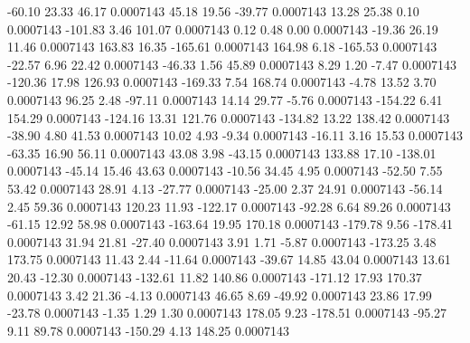       -60.10       23.33       46.17     0.0007143
       45.18       19.56      -39.77     0.0007143
       13.28       25.38        0.10     0.0007143
     -101.83        3.46      101.07     0.0007143
        0.12        0.48        0.00     0.0007143
      -19.36       26.19       11.46     0.0007143
      163.83       16.35     -165.61     0.0007143
      164.98        6.18     -165.53     0.0007143
      -22.57        6.96       22.42     0.0007143
      -46.33        1.56       45.89     0.0007143
        8.29        1.20       -7.47     0.0007143
     -120.36       17.98      126.93     0.0007143
     -169.33        7.54      168.74     0.0007143
       -4.78       13.52        3.70     0.0007143
       96.25        2.48      -97.11     0.0007143
       14.14       29.77       -5.76     0.0007143
     -154.22        6.41      154.29     0.0007143
     -124.16       13.31      121.76     0.0007143
     -134.82       13.22      138.42     0.0007143
      -38.90        4.80       41.53     0.0007143
       10.02        4.93       -9.34     0.0007143
      -16.11        3.16       15.53     0.0007143
      -63.35       16.90       56.11     0.0007143
       43.08        3.98      -43.15     0.0007143
      133.88       17.10     -138.01     0.0007143
      -45.14       15.46       43.63     0.0007143
      -10.56       34.45        4.95     0.0007143
      -52.50        7.55       53.42     0.0007143
       28.91        4.13      -27.77     0.0007143
      -25.00        2.37       24.91     0.0007143
      -56.14        2.45       59.36     0.0007143
      120.23       11.93     -122.17     0.0007143
      -92.28        6.64       89.26     0.0007143
      -61.15       12.92       58.98     0.0007143
     -163.64       19.95      170.18     0.0007143
     -179.78        9.56     -178.41     0.0007143
       31.94       21.81      -27.40     0.0007143
        3.91        1.71       -5.87     0.0007143
     -173.25        3.48      173.75     0.0007143
       11.43        2.44      -11.64     0.0007143
      -39.67       14.85       43.04     0.0007143
       13.61       20.43      -12.30     0.0007143
     -132.61       11.82      140.86     0.0007143
     -171.12       17.93      170.37     0.0007143
        3.42       21.36       -4.13     0.0007143
       46.65        8.69      -49.92     0.0007143
       23.86       17.99      -23.78     0.0007143
       -1.35        1.29        1.30     0.0007143
      178.05        9.23     -178.51     0.0007143
      -95.27        9.11       89.78     0.0007143
     -150.29        4.13      148.25     0.0007143
